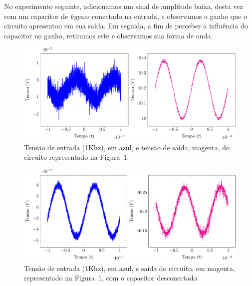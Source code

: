 \documentclass[12pt,a4paper]{article}
\begin{document}
No experimento seguinte, adicionamos um sinal de amplitude baixa, desta vez com um capacitor de \emph{bypass}
conectado na entrada, e observamos o ganho que o circuito apresentou em sua saída. Em seguida, 
a fim de perceber a influência do capacitor no ganho, retiramos este e observamos sua forma de onda.
\begin{figure}[htpb]
  \centering
  \includegraphics[width=\linewidth]{./img/scope1.pdf}
  \caption{Tensão de entrada (1Khz), em azul, e tensão de saída, magenta, do circuito representado na Figura~1.}
  \label{fig:ndegenerado}
\end{figure}
\begin{figure}[htpb]
  \centering
  \includegraphics[width=\linewidth]{./img/scope2.pdf}
  \caption{Tensão de entrada (1Khz), em azul, e saída do circuito, em magenta, representado na Figura~1, com o capacitor desconectado. }
  \label{fig:degenerado}
\end{figure}
\end{document}
